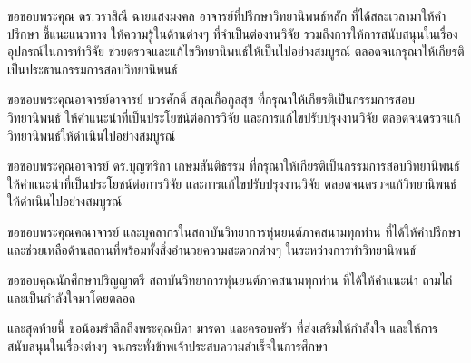 \begin{acknowledgements}
ขอขอบพระคุณ ดร.วราสิณี ฉายแสงมงคล อาจารย์ที่ปรึกษาวิทยานิพนธ์หลัก
ที่ได้สละเวลามาให้คำปรึกษา ชี้แนะแนวทาง ให้ความรู้ในด้านต่างๆ ที่จำเป็นต่องานวิจัย 
รวมถึงการให้การสนับสนุนในเรื่องอุปกรณ์ในการทำวิจัย ช่วยตรวจและแก้ไขวิทยานิพนธ์ให้เป็นไปอย่างสมบูรณ์
ตลอดจนกรุณาให้เกียรติเป็นประธานกรรมการสอบวิทยานิพนธ์

ขอขอบพระคุณอาจารย์อาจารย์ บวรศักดิ์ สกุลเกื้อกูลสุข ที่กรุณาให้เกียรติเป็นกรรมการสอบวิทยานิพนธ์ 
ให้คำแนะนำที่เป็นประโยชน์ต่อการวิจัย และการแก้ไขปรับปรุงงานวิจัย ตลอดจนตรวจแก้วิทยานิพนธ์ให้ดำเนินไปอย่างสมบูรณ์

ขอขอบพระคุณอาจารย์ ดร.บุญฑริกา เกษมสันติธรรม ที่กรุณาให้เกียรติเป็นกรรมการสอบวิทยานิพนธ์ 
ให้คำแนะนำที่เป็นประโยชน์ต่อการวิจัย และการแก้ไขปรับปรุงงานวิจัย ตลอดจนตรวจแก้วิทยานิพนธ์ให้ดำเนินไปอย่างสมบูรณ์

ขอขอบพระคุณคณาจารย์ และบุคลากรในสถาบันวิทยาการหุ่นยนต์ภาคสนามทุกท่าน
ที่ได้ให้คำปรึกษาและช่วยเหลือด้านสถานที่พร้อมทั้งสิ่งอำนวยความสะดวกต่างๆ ในระหว่างการทำวิทยานิพนธ์

ขอขอบคุณนักศึกษาปริญญาตรี สถาบันวิทยาการหุ่นยนต์ภาคสนามทุกท่าน
ที่ได้ให้คำแนะนำ ถามไถ่ และเป็นกำลังใจมาโดยตลอด

และสุดท้ายนี้ ขอน้อมรำลึกถึงพระคุณบิดา มารดา และครอบครัว ที่ส่งเสริมให้กำลังใจ
และให้การสนับสนุนในเรื่องต่างๆ จนกระทั่งข้าพเจ้าประสบความสำเร็จในการศึกษา
\end{acknowledgements}